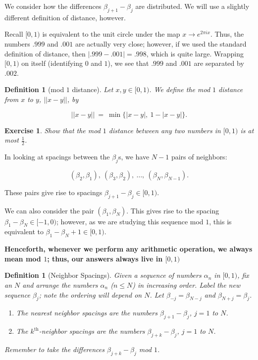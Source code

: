 \documentclass[12pt,letterpaper]{report}
\newcommand\be{\begin{equation}}
\newcommand\ee{\end{equation}}
\newcommand\ben{\begin{enumerate}}
\newcommand\een{\end{enumerate}}
\newcommand{\tbf}[1]{\textbf{#1}}
\newcommand{\foh}{\frac{1}{2}}  %
\newtheorem{defi}[thm]{Definition}
\newtheorem{exe}[thm]{Exercise}
\begin{document}
We consider how the differences $\beta_{j+1} - \beta_j$ are
distributed. We will use a slightly different definition of
distance, however.

Recall $[0,1)$ is equivalent to the unit circle under the map $x
\to e^{2\pi i x}$. Thus, the numbers $.999$ and $.001$ are
actually very close; however, if we used the standard definition
of distance, then $|.999 - .001| = .998$, which is quite large.
Wrapping $[0,1)$ on itself (identifying $0$ and $1$), we see that
$.999$ and $.001$ are separated by $.002$.


\begin{defi}[mod $1$ distance] Let $x, y \in [0,1)$. We define the
mod $1$ distance from $x$ to $y$, $||x - y||$, by

\be ||x - y|| \ = \ \min\Big\{ |x - y|, \ 1 - |x - y| \Big\}. \ee
\end{defi}

\begin{exe} Show that the mod $1$ distance between any two numbers
in $[0,1)$ is at most $\foh$. \end{exe}



In looking at spacings between the $\beta_j$s, we have $N-1$ pairs
of neighbors:

\be (\beta_2,\beta_1),\ (\beta_3,\beta_2), \ \dots, \
(\beta_N,\beta_{N-1}). \ee

These pairs give rise to spacings $\beta_{j+1} - \beta_j \in
[0,1)$.

We can also consider the pair $(\beta_1,\beta_N)$. This gives rise
to the spacing $\beta_1 - \beta_N \in [-1,0)$; however, as we are
studying this sequence mod $1$, this is equivalent to $\beta_1 -
\beta_N + 1 \in [0,1)$.

\tbf{Henceforth, whenever we perform any arithmetic operation, we
always mean mod $1$; thus, our answers always live in $[0,1)$}

\begin{defi}[Neighbor Spacings] Given a sequence of numbers
$\alpha_n$ in $[0,1)$, fix an $N$ and arrange the numbers
$\alpha_n$ ($n \le N$) in increasing order. Label the new sequence
$\beta_j$; note the ordering will depend on $N$. Let $\beta_{-j} =
\beta_{N-j}$ and $\beta_{N+j} = \beta_{j}$.

\ben
\item The nearest neighbor spacings are the numbers $\beta_{j+1} -
\beta_j$, $j = 1$ to $N$.
\item The $k^{\text{th}}$-neighbor spacings are the numbers
$\beta_{j+k} - \beta_j$, $j = 1$ to $N$. \een

Remember to take the differences $\beta_{j+k} - \beta_j$ mod $1$.
\end{defi}
\end{document}
